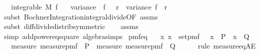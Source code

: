 \begin{isabellebody}
\ \ \ {\isachardoublequoteopen}integrable\ M\ f{\isachardoublequoteclose}\isanewline
\ \ \ {\isachardoublequoteopen}variance\ {\isacharparenleft}{\kern0pt}{\isasymlambda}{\isasymomega}{\isachardot}{\kern0pt}\ f\ {\isasymomega}\ {\isacharslash}{\kern0pt}\ r{\isacharparenright}{\kern0pt}\ {\isacharequal}{\kern0pt}\ variance\ f\ {\isacharslash}{\kern0pt}\ r{\isacharcircum}{\kern0pt}{}{\isachardoublequoteclose}\isanewline
%
\isadelimproof
\ \ %
\endisadelimproof
%
\isatagproof
{}\isamarkupfalse%
\ {\isacharparenleft}{\kern0pt}subst\ Bochner{\isacharunderscore}{\kern0pt}Integration{\isachardot}{\kern0pt}integral{\isacharunderscore}{\kern0pt}divide{\isacharbrackleft}{\kern0pt}OF\ assms{\isacharparenleft}{\kern0pt}{}{\isacharparenright}{\kern0pt}{\isacharbrackright}{\kern0pt}{\isacharparenright}{\kern0pt}\isanewline
\ \ \isamarkupfalse%
\ {\isacharparenleft}{\kern0pt}subst\ diff{\isacharunderscore}{\kern0pt}divide{\isacharunderscore}{\kern0pt}distrib{\isacharbrackleft}{\kern0pt}symmetric{\isacharbrackright}{\kern0pt}{\isacharparenright}{\kern0pt}\isanewline
\ \ \isamarkupfalse%
\ assms\ \isamarkupfalse%
\ {\isacharparenleft}{\kern0pt}simp\ add{\isacharcolon}{\kern0pt}power{}{\isacharunderscore}{\kern0pt}eq{\isacharunderscore}{\kern0pt}square\ algebra{\isacharunderscore}{\kern0pt}simps{\isacharparenright}{\kern0pt}%
\endisatagproof
{\isafoldproof}%
%
\isadelimproof
\isanewline
%
\endisadelimproof
\isanewline
{}\isamarkupfalse%
\ pmf{\isacharunderscore}{\kern0pt}eq{\isacharcolon}{\kern0pt}\isanewline
\ \ \ {\isachardoublequoteopen}{\isasymAnd}x{\isachardot}{\kern0pt}\ x\ {\isasymin}\ set{\isacharunderscore}{\kern0pt}pmf\ {\isasymOmega}\ {\isasymLongrightarrow}\ {\isacharparenleft}{\kern0pt}x\ {\isasymin}\ P{\isacharparenright}{\kern0pt}\ {\isacharequal}{\kern0pt}\ {\isacharparenleft}{\kern0pt}x\ {\isasymin}\ Q{\isacharparenright}{\kern0pt}{\isachardoublequoteclose}\isanewline
\ \ \ {\isachardoublequoteopen}measure\ {\isacharparenleft}{\kern0pt}measure{\isacharunderscore}{\kern0pt}pmf\ {\isasymOmega}{\isacharparenright}{\kern0pt}\ P\ {\isacharequal}{\kern0pt}\ measure\ {\isacharparenleft}{\kern0pt}measure{\isacharunderscore}{\kern0pt}pmf\ {\isasymOmega}{\isacharparenright}{\kern0pt}\ Q{\isachardoublequoteclose}\isanewline
%
\isadelimproof
\ \ \ \ %
\endisadelimproof
%
\isatagproof
{}\isamarkupfalse%
\ {\isacharparenleft}{\kern0pt}rule\ measure{\isacharunderscore}{\kern0pt}eq{\isacharunderscore}{\kern0pt}AE{\isacharparenright}{\kern0pt}\isanewline

\end{isabellebody}
